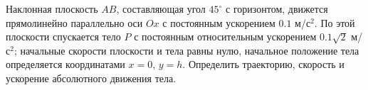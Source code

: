 Наклонная плоскость $AB$, составляющая угол $45^{\circ}$ с горизонтом,
движется прямолинейно параллельно оси $Ox$
с постоянным ускорением $0.1$ м/с$^2$.
По этой плоскости спускается тело $P$ с постоянным относительным ускорением
$0.1\sqrt{2}$ м/с$^2$; начальные скорости плоскости и тела равны нулю,
начальное положение тела определяется координатами $x = 0$, $y = h$.
Определить траекторию, скорость и ускорение абсолютного движения тела.

